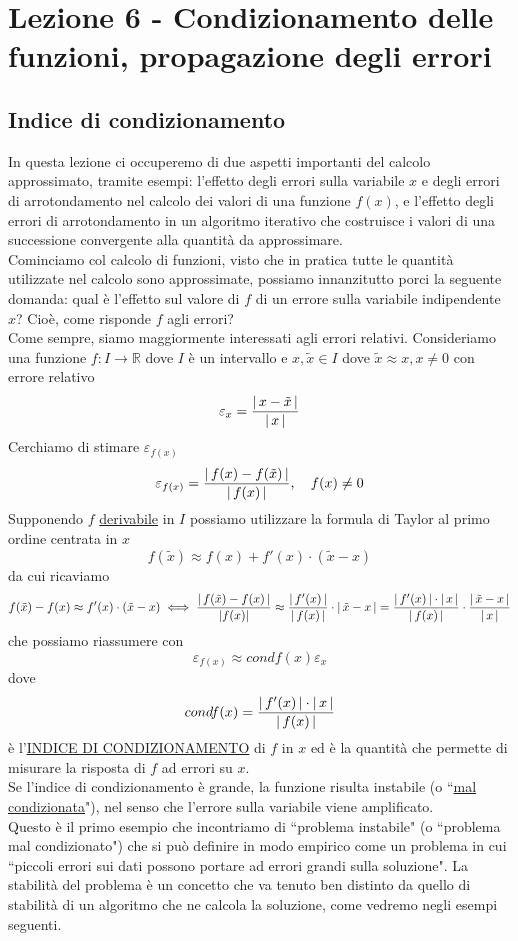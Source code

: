 \documentclass[12pt]{article}
\DeclarePairedDelimiter{\abs}{\lvert}{\rvert}
\begin{document}
\section{Lezione 6 - Condizionamento delle funzioni, propagazione degli errori}
\subsection{Indice di condizionamento}
In questa lezione ci occuperemo di due aspetti importanti del calcolo approssimato, tramite esempi: l'effetto degli errori sulla variabile $x$ e degli errori di arrotondamento nel calcolo dei valori di una funzione $f(x)$, e l'effetto degli errori di arrotondamento in un algoritmo iterativo che costruisce i valori di una successione convergente alla quantità da approssimare.\\
Cominciamo col calcolo di funzioni, visto che in pratica tutte le quantità utilizzate nel calcolo sono approssimate, possiamo innanzitutto porci la seguente domanda: qual è l'effetto sul valore di $f$ di un errore sulla variabile indipendente $x$? Cioè, come risponde $f$ agli errori?\\
Come sempre, siamo maggiormente interessati agli errori relativi. Consideriamo una funzione $f: I \to \mathbb{R}$ dove $I$ è un intervallo e $x, \tilde{x} \in I$ dove $\tilde{x} \approx x, x \neq 0$ con errore relativo
\[\varepsilon_x = \frac{\abs{\,x-\tilde{x}\,}}{\abs{\,x\,}}\]
Cerchiamo di stimare $\varepsilon_{f(x)}$\\
\[ \varepsilon_{f(x)} = \frac{\abs{\,f(x)-f(\tilde{x})\,}}{\abs{\,f(x)\,}}, \quad f(x) \neq 0 \]
Supponendo $f$ \uline{derivabile} in $I$ possiamo utilizzare la formula
di Taylor al primo ordine centrata in $x$
\[ f(\tilde{x}) \approx f(x) + f'(x)\cdot (\tilde{x}-x) \]
da cui ricaviamo
\[ f(\tilde{x})-f(x) \approx f'(x)\cdot (\tilde{x}-x) \iff
        \frac{\abs{\,f(\tilde{x})-f(x)\,}}{\abs{f(x)}} \approx \frac{\abs{\,f'(x)\,}}{\abs{\,f(x)\,}} \cdot \abs{\,\tilde{x}-x\,} = \frac{\abs{\,f'(x)\,} \cdot \abs{\,x\,}}{\abs{\,f(x)\,}} \cdot \frac{\abs{\,\tilde{x}-x\,}}{\abs{\,x\,}} \]
che possiamo riassumere con \[\varepsilon_{f(x)} \approx condf(x) \varepsilon_x \] dove
\[ condf(x)=\frac{\abs{\,f'(x)\,} \cdot \abs{\,x\,}}{\abs{\,f(x)\,}} \]
è l'\uline{INDICE DI CONDIZIONAMENTO} di $f$ in $x$ ed è la quantità che permette di misurare la risposta di $f$ ad errori su $x$.\\
Se l'indice di condizionamento è grande, la funzione risulta instabile (o ``\uline{mal condizionata}"), nel senso che l'errore sulla variabile viene amplificato.\\
Questo è il primo esempio che incontriamo di ``problema instabile" (o ``problema mal condizionato") che si può definire in modo empirico come un problema in cui ``piccoli errori sui dati possono portare ad errori grandi sulla soluzione".\newline \newline
La stabilità del problema è un concetto che va tenuto ben distinto da quello di stabilità di un algoritmo che ne calcola la soluzione, come vedremo negli esempi seguenti.
\end{document}
